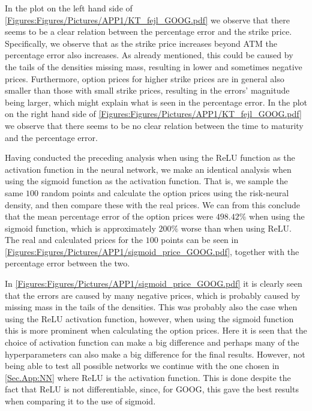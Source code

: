 
In the plot on the left hand side of \autoref{Figures:Figures/Pictures/APP1/KT_fejl_GOOG.pdf} we observe that there seems to be a clear relation between the percentage error and the strike price. Specifically, we observe that as the strike price increases beyond ATM the percentage error also increases. As already mentioned, this could be caused by the tails of the densities missing mass, resulting in lower and sometimes negative prices. Furthermore, option prices for higher strike prices are in general also smaller than those with small strike prices, resulting in the errors' magnitude being larger, which might explain what is seen in the percentage error. In the plot on the right hand side of \autoref{Figures:Figures/Pictures/APP1/KT_fejl_GOOG.pdf} we observe that there seems to be no clear relation between the time to maturity and the percentage error.

Having conducted the preceding analysis when using the ReLU function as the activation function in the neural network, we make an identical analysis when using the sigmoid function as the activation function. That is, we sample the same $100$ random points and calculate the option prices using the risk-neural density, and then compare these with the real prices. We can from this conclude that the mean percentage error of the option prices were $498.42\%$ when using the sigmoid function, which is approximately $200\%$ worse than when using ReLU. The real and calculated prices for the $100$ points can be seen in \autoref{Figures:Figures/Pictures/APP1/sigmoid_price_GOOG.pdf}, together with the percentage error between the two. 


In \autoref{Figures:Figures/Pictures/APP1/sigmoid_price_GOOG.pdf} it is clearly seen that the errors are caused by many negative prices, which is probably caused by missing mass in the tails of the densities. This was probably also the case when using the ReLU activation function, however, when using the sigmoid function this is more prominent when calculating the option prices. Here it is seen that the choice of activation function can make a big difference and perhaps many of the hyperparameters can also make a big difference for the final results. However, not being able to test all possible networks we continue with the one chosen in \autoref{Sec.App:NN} where ReLU is the activation function. This is done despite the fact that ReLU is not differentiable, since, for GOOG, this gave the best results when comparing it to the use of sigmoid. 


